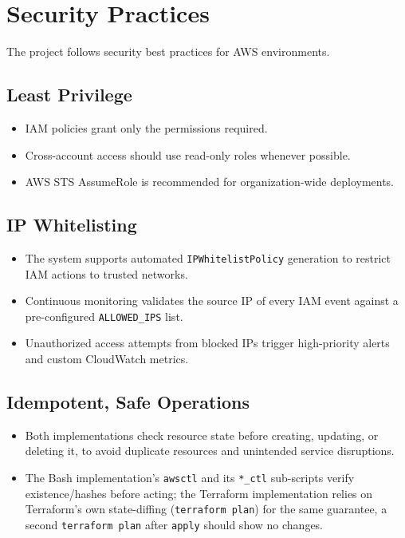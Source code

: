 \documentclass[11pt,a4paper]{report}
\begin{document}
\section{Security Practices}

The project follows security best practices for AWS environments.

\subsection{Least Privilege}

\begin{itemize}[leftmargin=1.4em]
  \item IAM policies grant only the permissions required.
  \item Cross-account access should use read-only roles whenever possible.
  \item AWS STS AssumeRole is recommended for organization-wide deployments.
\end{itemize}

\subsection{IP Whitelisting}

\begin{itemize}[leftmargin=1.4em]
  \item The system supports automated \texttt{IPWhitelistPolicy} generation to restrict IAM actions to trusted networks.
  \item Continuous monitoring validates the source IP of every IAM event against a pre-configured \texttt{ALLOWED\_IPS} list.
  \item Unauthorized access attempts from blocked IPs trigger high-priority alerts and custom CloudWatch metrics.
\end{itemize}

\subsection{Idempotent, Safe Operations}

\begin{itemize}[leftmargin=1.4em]
  \item Both implementations check resource state before creating, updating, or deleting it, to avoid duplicate resources and unintended service disruptions.
  \item The Bash implementation's \texttt{awsctl} and its \texttt{*\_ctl} sub-scripts verify existence/hashes before acting; the Terraform implementation relies on Terraform's own state-diffing (\texttt{terraform plan}) for the same guarantee, a second \texttt{terraform plan} after \texttt{apply} should show no changes.
\end{itemize}
\end{document}
